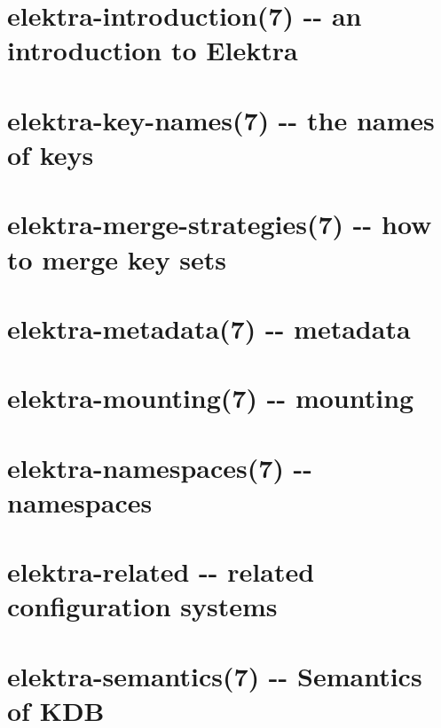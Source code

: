 \documentclass[twoside]{book}
\newcommand{\+}{\discretionary{\mbox{\scriptsize$\hookleftarrow$}}{}{}}
\begin{document}
\chapter{elektra-\/introduction(7) -\/-\/ an introduction to Elektra}
\label{md_doc_help_elektra-introduction}

\chapter{elektra-\/key-\/names(7) -\/-\/ the names of keys}
\label{md_doc_help_elektra-key-names}

\chapter{elektra-\/merge-\/strategies(7) -\/-\/ how to merge key sets}
\label{md_doc_help_elektra-merge-strategy}

\chapter{elektra-\/metadata(7) -\/-\/ metadata}
\label{md_doc_help_elektra-metadata}

\chapter{elektra-\/mounting(7) -\/-\/ mounting}
\label{md_doc_help_elektra-mounting}

\chapter{elektra-\/namespaces(7) -\/-\/ namespaces}
\label{md_doc_help_elektra-namespaces}

\chapter{elektra-\/related -\/-\/ related configuration systems}
\label{md_doc_help_elektra-related}

\chapter{elektra-\/semantics(7) -\/-\/ Semantics of K\+DB}
\label{md_doc_help_elektra-semantics}

\end{document}
